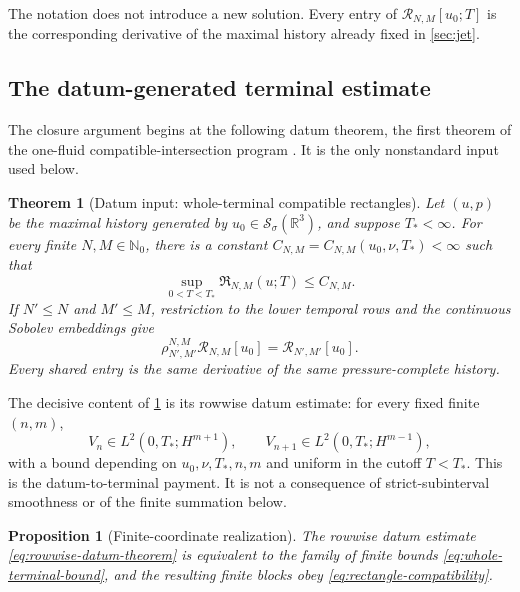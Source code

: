 \documentclass[11pt]{article}
\newtheorem{theorem}{Theorem}[section]
\newtheorem{proposition}[proposition]{Proposition}
\theoremstyle{definition}
\theoremstyle{remark}
\newcommand{\R}{\mathbb R}
\newcommand{\Nzero}{\mathbb N_0}
\newcommand{\Schwartz}{\mathcal S}
\newcommand{\cR}{\mathcal R}
\begin{document}
The notation does not introduce a new solution.  Every entry of
\(\cR_{N,M}[u_0;T]\) is the corresponding derivative of the maximal history
already fixed in \cref{sec:jet}.

\subsection{The datum-generated terminal estimate}

The closure argument begins at the following datum theorem, the first theorem
of the one-fluid compatible-intersection program \cite{BirnieDatum}.  It is
the only nonstandard input used below.

\medskip
\begin{theorem}[Datum input: whole-terminal compatible rectangles]
\label{thm:rectangles}
Let \((u,p)\) be the maximal history generated by
\(u_0\in\Schwartz_\sigma(\R^3)\), and suppose \(T_*<\infty\).  For every
finite \(N,M\in\Nzero\), there is a constant
\(C_{N,M}=C_{N,M}(u_0,\nu,T_*)<\infty\) such that
\begin{equation}
 \sup_{0<T<T_*}\mathfrak R_{N,M}(u;T)
 \leq C_{N,M}.
 \label{eq:whole-terminal-bound}
\end{equation}
If \(N'\leq N\) and \(M'\leq M\), restriction to the lower temporal rows and
the continuous Sobolev embeddings give
\begin{equation}
 \rho_{N',M'}^{N,M}\cR_{N,M}[u_0]
 =\cR_{N',M'}[u_0].
 \label{eq:rectangle-compatibility}
\end{equation}
Every shared entry is the same derivative of the same pressure-complete
history.
\end{theorem}

The decisive content of \cref{thm:rectangles} is its rowwise datum estimate:
for every fixed finite \((n,m)\),
\begin{equation}
 V_n\in L^2(0,T_*;H^{m+1}),
 \qquad
 V_{n+1}\in L^2(0,T_*;H^{m-1}),
 \label{eq:rowwise-datum-theorem}
\end{equation}
with a bound depending on \(u_0,\nu,T_*,n,m\) and uniform in the cutoff
\(T<T_*\).  This is the datum-to-terminal payment.  It is not a consequence
of strict-subinterval smoothness or of the finite summation below.

\begin{proposition}[Finite-coordinate realization]
\label{prop:finite-realization}
The rowwise datum estimate \eqref{eq:rowwise-datum-theorem} is equivalent to
the family of finite bounds \eqref{eq:whole-terminal-bound}, and the resulting
finite blocks obey \eqref{eq:rectangle-compatibility}.
\end{proposition}
\end{document}
